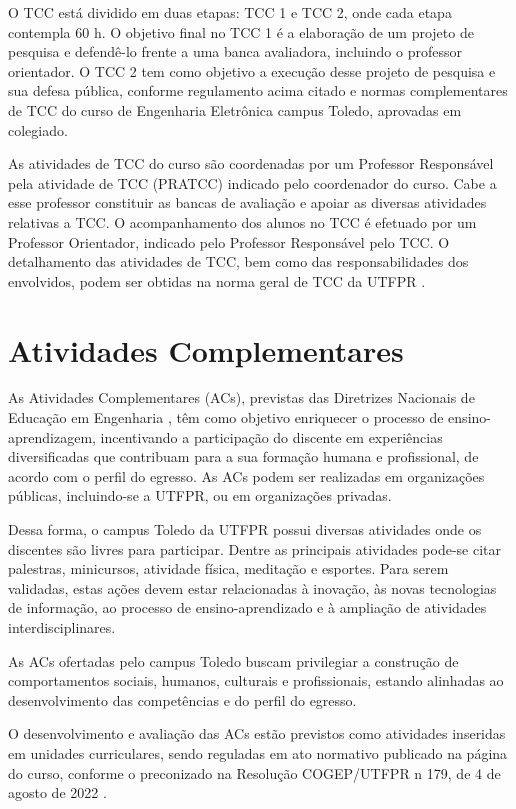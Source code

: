 O TCC está dividido em duas etapas: TCC 1 e TCC 2, onde cada etapa contempla 60 h. O objetivo final no TCC 1 é a elaboração de um projeto de pesquisa e defendê-lo frente a uma banca avaliadora, incluindo o professor orientador. O TCC 2 tem como objetivo a execução desse projeto de pesquisa e sua defesa pública, conforme regulamento acima citado e normas complementares de TCC do curso de Engenharia Eletrônica campus Toledo, aprovadas em colegiado.

As atividades de TCC do curso são coordenadas por um Professor Responsável pela atividade de TCC (PRATCC) indicado pelo coordenador do curso. Cabe a esse professor constituir as bancas de avaliação e apoiar as diversas atividades relativas a TCC. O acompanhamento dos alunos no TCC é efetuado por um Professor Orientador, indicado pelo Professor Responsável pelo TCC. O detalhamento das atividades de TCC, bem como das responsabilidades dos envolvidos, podem ser obtidas na norma geral de TCC da UTFPR \cite{cogep18}.

\section{Atividades Complementares}

As Atividades Complementares (ACs), previstas das Diretrizes Nacionais de Educação em Engenharia \cite{dcneng}, têm como objetivo enriquecer o processo de ensino-aprendizagem, incentivando a participação do discente em experiências diversificadas que contribuam para a sua formação humana e profissional, de acordo com o perfil do egresso. As ACs podem ser realizadas em organizações públicas, incluindo-se a UTFPR, ou em organizações privadas. 


Dessa forma, o campus Toledo da UTFPR possui diversas atividades onde os discentes são livres para participar. Dentre as principais atividades pode-se citar palestras, minicursos, atividade física, meditação e esportes. Para serem validadas, estas ações devem estar relacionadas à inovação, às novas tecnologias de informação, ao processo de ensino-aprendizado e à ampliação de atividades interdisciplinares. 

As ACs ofertadas pelo campus Toledo buscam privilegiar a construção de comportamentos sociais, humanos, culturais e profissionais, estando alinhadas ao desenvolvimento das competências e do perfil do egresso.

O desenvolvimento e avaliação das ACs estão previstos como atividades inseridas em unidades curriculares, sendo reguladas em ato normativo publicado na página do curso, conforme o preconizado na Resolução COGEP/UTFPR n\textordmasculine{} 179, de 4 de agosto de 2022 \cite{cogep179}.

